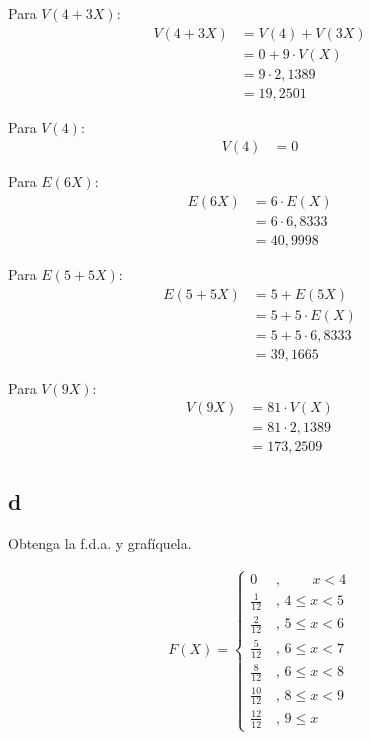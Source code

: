 \documentclass{templateNote}
\begin{document}
Para $V(4+3X)$:
\begin{align*}
    V(4+3X) &= V(4) + V(3X) \\
    &= 0 + 9 \cdot V(X) \\
    &= 9 \cdot 2,1389 \\
    &= 19,2501
\end{align*}

Para $V(4)$:
\begin{align*}
    V(4) &= 0
\end{align*}

Para $E(6X)$:
\begin{align*}
    E(6X) &= 6 \cdot E(X) \\
    &= 6 \cdot 6,8333 \\
    &= 40,9998
\end{align*}

Para $E(5+5X)$:
\begin{align*}
    E(5+5X) &= 5 + E(5X) \\
    &= 5 + 5 \cdot E(X) \\
    &= 5 + 5 \cdot 6,8333 \\
    &= 39,1665
\end{align*}

Para $V(9X)$:
\begin{align*}
    V(9X) &= 81 \cdot V(X) \\
    &= 81 \cdot 2,1389 \\
    &= 173,2509
\end{align*}

\subsection{d}
Obtenga la f.d.a. y grafíquela.

\begin{align*}
    F(X) =
    \displaystyle \begin{cases}
        0 \quad \text{ , } \quad \quad x < 4\\
        \frac{1}{12} \quad \text{, }4 \leq x < 5 \\
        \frac{2}{12} \quad \text{, }5 \leq x < 6 \\
        \frac{5}{12} \quad \text{, }6 \leq x < 7 \\
        \frac{8}{12} \quad \text{, }6 \leq x < 8 \\
        \frac{10}{12} \quad \text{, }8 \leq x < 9 \\
        \frac{12}{12} \quad \text{, }9 \leq x
    \end{cases}
\end{align*}
\end{document}
